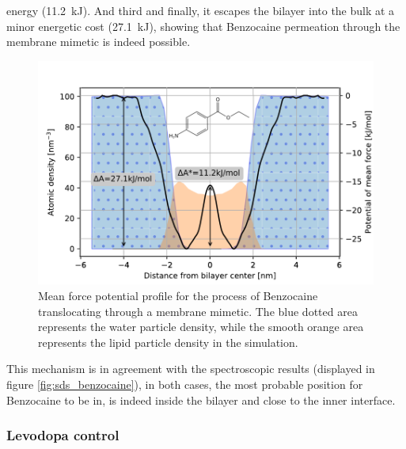 \documentclass[3p,preprint,review]{elsarticle}
\begin{document}
	energy (\SI{11.2}{\kilo\joule}). And third and finally, it escapes the bilayer
	into the bulk at a minor energetic cost (\SI{27.1}{kJ}), showing that
	Benzocaine
	permeation through the membrane mimetic is indeed possible.\\
	\begin{figure}[htb]
		\centering
		\includegraphics[width=\columnwidth]{benzo_profile_density}
		\caption{Mean force potential profile for the process of Benzocaine
			translocating through a membrane mimetic. The blue dotted area represents
			the water particle density, while the smooth orange area represents the
			lipid particle density in the simulation.}
		\label{fig:benzocaine_profile}
	\end{figure}
	This mechanism is in agreement with the spectroscopic results
	(displayed in figure \ref{fig:sds_benzocaine}), in both cases, the most
	probable
	position for Benzocaine to be in, is indeed inside the bilayer and close to the
	inner
	interface.\\
	
	\subsubsection{Levodopa control}
	\label{sec:ldopa}
	
\end{document}
